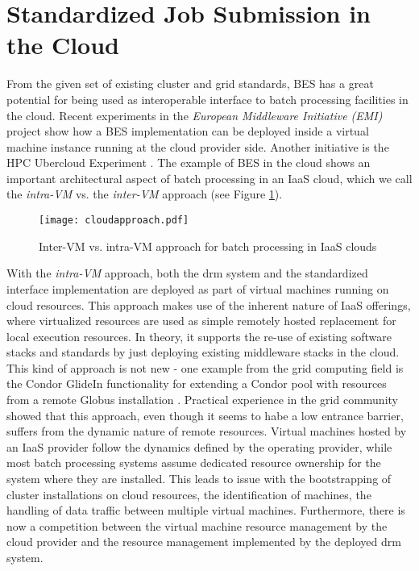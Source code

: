 \documentclass[twocolumn]{svjour3}       %
\begin{document}
\section{Standardized Job Submission in the Cloud}

From the given set of existing cluster and grid standards, BES has a great potential for being used as interoperable interface to batch processing facilities in the cloud. Recent experiments in the \emph{European Middleware Initiative (EMI)} project show how a BES implementation can be deployed inside a virtual machine instance running at the cloud provider side. Another initiative is the HPC Ubercloud Experiment \cite{citemaster_9647}. The example of BES in the cloud shows an important architectural aspect of batch processing in an IaaS cloud, which we call the \emph{intra-VM} vs. the \emph{inter-VM} approach (see Figure \ref{fig:vmapproach}).  

\begin{figure}
  \texttt{[image: cloudapproach.pdf]}
\caption{Inter-VM vs. intra-VM approach for batch processing in IaaS clouds}
\label{fig:vmapproach} 
\end{figure}


With the \emph{intra-VM} approach, both the \gls{drm} system and the standardized interface implementation are deployed as part of virtual machines running on cloud resources. This approach makes use of the inherent nature of IaaS offerings, where virtualized resources are used as simple remotely hosted replacement for local execution resources. In theory, it supports the re-use of existing software stacks and standards by just deploying existing middleware stacks in the cloud. This kind of approach is not new - one example from the grid computing field is the Condor GlideIn functionality for extending a Condor pool with resources from a remote Globus installation \cite{condorgrid}. Practical experience in the grid community showed that this approach, even though it seems to habe a low entrance barrier, suffers from the dynamic nature of remote resources. Virtual machines hosted by an IaaS provider follow the dynamics defined by the operating provider, while most batch processing systems assume dedicated resource ownership for the system where they are installed. This leads to issue with the bootstrapping of cluster installations on cloud resources, the identification of machines, the handling of data traffic between multiple virtual machines. Furthermore, there is now a competition between the virtual machine resource management by the cloud provider and the resource management implemented by the deployed \gls{drm} system.
\end{document}
